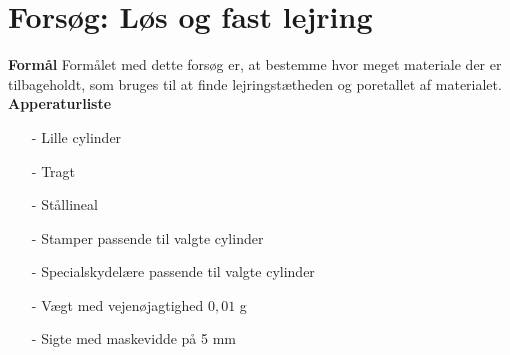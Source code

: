 \chapter{Forsøg: Løs og fast lejring}

\textbf{Formål}
\newline
Formålet med dette forsøg er, at bestemme hvor meget materiale der er tilbageholdt, som bruges til at finde lejringstætheden og poretallet af materialet.
\newline
\newline
\textbf{Apperaturliste}
\begin{itemize}
	\item[-] Lille cylinder
	\item[-] Tragt
	\item[-] Stållineal
	\item[-] Stamper passende til valgte cylinder
	\item[-] Specialskydelære passende til valgte cylinder
	\item[-] Vægt med vejenøjagtighed $0,\!01$ g
	\item[-] Sigte med maskevidde på 5 mm 
\end{itemize}

